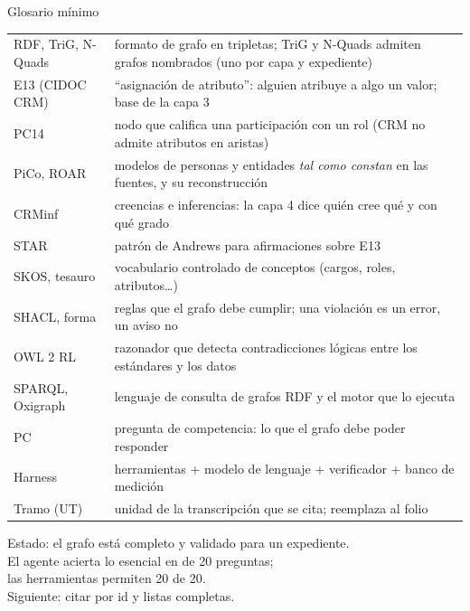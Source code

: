 \documentclass[aspectratio=169,10pt]{beamer}
\begin{document}
\begin{frame}{Glosario mínimo}
\footnotesize
\begin{tabular}{@{}lp{10.6cm}@{}}
\toprule
RDF, TriG, N-Quads & formato de grafo en tripletas; TriG y N-Quads admiten \alert{grafos nombrados} (uno por capa y expediente) \\
E13 (CIDOC CRM) & \enquote{asignación de atributo}: alguien atribuye a algo un valor; base de la capa 3 \\
PC14 & nodo que califica una participación con un rol (CRM no admite atributos en aristas) \\
PiCo, ROAR & modelos de personas y entidades \emph{tal como constan} en las fuentes, y su reconstrucción \\
CRMinf & creencias e inferencias: la capa 4 dice quién cree qué y con qué grado \\
STAR & patrón de Andrews para afirmaciones sobre E13 \\
SKOS, tesauro & vocabulario controlado de conceptos (cargos, roles, atributos…) \\
SHACL, forma & reglas que el grafo debe cumplir; una violación es un error, un aviso no \\
OWL 2 RL & razonador que detecta contradicciones lógicas entre los estándares y los datos \\
SPARQL, Oxigraph & lenguaje de consulta de grafos RDF y el motor que lo ejecuta \\
PC & pregunta de competencia: lo que el grafo debe poder responder \\
Harness & herramientas + modelo de lenguaje + verificador + banco de medición \\
Tramo (UT) & unidad de la transcripción que se cita; reemplaza al folio \\
\bottomrule
\end{tabular}
\end{frame}

\begin{frame}[standout]
Estado: el grafo está completo y validado para un expediente.\\[4pt]
El agente acierta lo esencial en \mediaEsencial{} de 20 preguntas;\\ las herramientas permiten 20 de 20.\\[4pt]
\alert{Siguiente: citar por id y listas completas.}
\end{frame}
\end{document}
